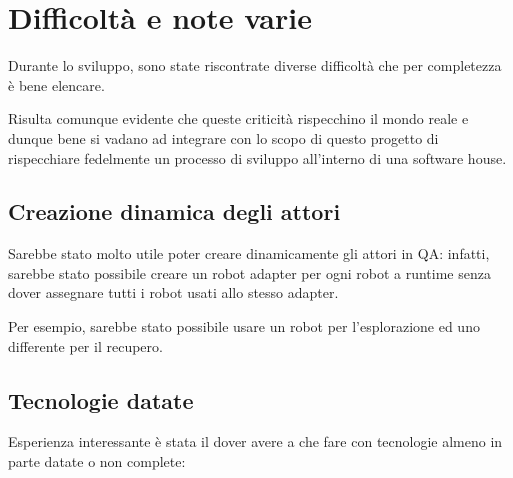 \section{Difficoltà e note varie}

Durante lo sviluppo, sono state riscontrate diverse difficoltà che per completezza è bene elencare.

Risulta comunque evidente che queste criticità rispecchino il mondo reale e dunque bene si vadano ad integrare con lo scopo di questo progetto di rispecchiare fedelmente un processo di sviluppo all'interno di una software house.

\subsection{Creazione dinamica degli attori}
Sarebbe stato molto utile poter creare dinamicamente gli attori in QA\@:
infatti, sarebbe stato possibile creare un robot adapter per ogni robot a runtime senza dover assegnare tutti i robot usati allo stesso adapter.

Per esempio, sarebbe stato possibile usare un robot per l'esplorazione ed uno differente per il recupero.

\subsection{Tecnologie datate}
Esperienza interessante è stata il dover avere a che fare con tecnologie almeno in parte datate o non complete:

